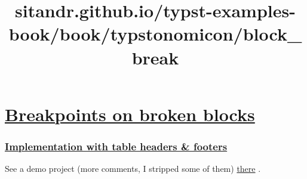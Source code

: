 \title{sitandr.github.io/typst-examples-book/book/typstonomicon/block_break}

\section{\texorpdfstring{\hyperref[breakpoints-on-broken-blocks]{Breakpoints
on broken
blocks}}{Breakpoints on broken blocks}}\label{breakpoints-on-broken-blocks}

\subsubsection{\texorpdfstring{\hyperref[implementation-with-table-headers--footers]{Implementation
with table headers \&
footers}}{Implementation with table headers \& footers}}\label{implementation-with-table-headers--footers}

See a demo project (more comments, I stripped some of them)
\href{https://typst.app/project/r-yQHF952iFnPme9BWbRu3}{there} .

